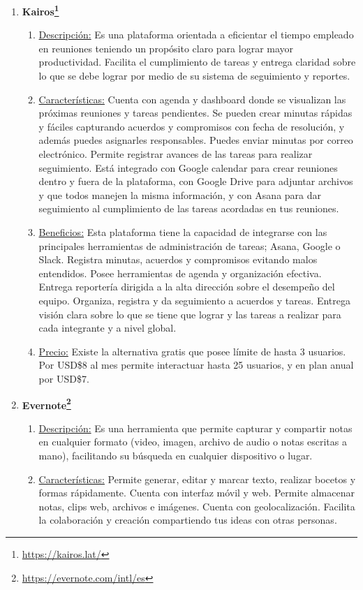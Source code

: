 \begin{enumerate}[1.]
\begin{enumerate}[a]
    \end{enumerate}	    
    \item \textbf{Kairos\footnote{\url{https://kairos.lat/}}}
    \begin{enumerate}[a]
	    \item \underline{Descripción:} Es una plataforma orientada a eficientar el tiempo empleado en reuniones teniendo un propósito claro para lograr mayor productividad. Facilita el cumplimiento de tareas y entrega claridad sobre lo que se debe lograr por medio de su sistema de seguimiento y reportes.  
		\item \underline{Características:} Cuenta con agenda y dashboard donde se visualizan las próximas reuniones y tareas pendientes. Se pueden crear minutas rápidas y fáciles capturando acuerdos y compromisos con fecha de resolución, y además puedes asignarles responsables. Puedes enviar minutas por correo electrónico. Permite registrar avances de las tareas para realizar seguimiento. Está integrado con Google calendar para crear reuniones dentro y fuera de la plataforma, con Google Drive para adjuntar archivos y que todos manejen la misma información, y con Asana para dar seguimiento al cumplimiento de las tareas acordadas en tus reuniones.
	    \item \underline{Beneficios:} Esta plataforma tiene la capacidad de integrarse con las principales herramientas de administración de tareas; Asana, Google o Slack. Registra minutas, acuerdos y compromisos evitando malos entendidos. Posee herramientas de agenda y organización efectiva. Entrega reportería dirigida a la alta dirección sobre el desempeño del equipo. Organiza, registra y da seguimiento a acuerdos y tareas. Entrega visión clara sobre lo que se tiene que lograr y las tareas a realizar para cada integrante y a nivel global. 
	    \item \underline{Precio:} Existe la alternativa gratis que posee límite de hasta 3 usuarios. Por USD\$8 al mes permite interactuar hasta 25 usuarios, y en plan anual por USD\$7.
    \end{enumerate}	    
    \item \textbf{Evernote\footnote{\url{https://evernote.com/intl/es}}}    
    \begin{enumerate}[a]
	    \item \underline{Descripción:} Es una herramienta que permite capturar y compartir notas en cualquier formato (video, imagen, archivo de audio o notas escritas a mano), facilitando su búsqueda en cualquier dispositivo o lugar.
		\item \underline{Características:} Permite generar, editar y marcar texto, realizar bocetos y formas rápidamente. Cuenta con interfaz móvil y web. Permite almacenar notas, clips web, archivos e imágenes. Cuenta con geolocalización. Facilita la colaboración y creación compartiendo tus ideas con otras personas.  

\end{enumerate}
\end{enumerate}
